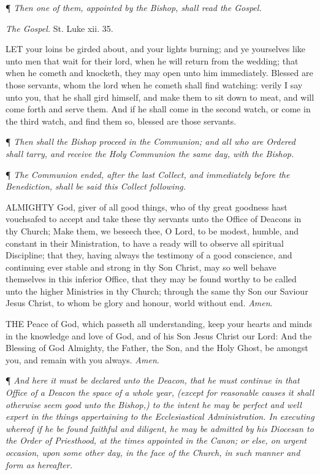¶ \emph{Then one of them, appointed
by the Bishop, shall read the Gospel.}

\emph{The Gospel.} St. Luke xii. 35.

LET your loins be girded
about, and your lights burning; and ye yourselves like unto men that wait
for their lord, when he will return from the wedding; that when he cometh
and knocketh, they may open unto him immediately. Blessed are those servants,
whom the lord when he cometh shall find watching: verily I say unto you,
that he shall gird himself, and make them to sit down to meat, and will
come forth and serve them. And if he shall come in the second watch, or
come in the third watch, and find them so, blessed are those servants.

¶ \emph{Then shall the
Bishop proceed in the Communion; and all who are Ordered shall tarry,
and receive the Holy Communion the same day, with the Bishop.}

¶ \emph{The Communion
ended, after the last Collect, and immediately before the Benediction,
shall be said this Collect following.}

ALMIGHTY God, giver of
all good things, who of thy great goodness hast vouchsafed to accept and
take these thy servants unto the Office of Deacons in thy Church; Make
them, we beseech thee, O Lord, to be modest, humble, and constant in their
Ministration, to have a ready will to observe all spiritual Discipline;
that they, having always the testimony of a good conscience, and continuing
ever stable and strong in thy Son Christ, may so well behave themselves
in this inferior Office, that they may be found worthy to be called unto
the higher Ministries in thy Church; through the same thy Son our Saviour
Jesus Christ, to whom be glory and honour, world without end. \emph{Amen}.

THE Peace of God, which
passeth all understanding, keep your hearts and minds in the knowledge
and love of God, and of his Son Jesus Christ our Lord: And the Blessing
of God Almighty, the Father, the Son, and the Holy Ghost, be amongst you,
and remain with you always. \emph{Amen}.

¶ \emph{And here it
must be declared unto the Deacon, that he must continue in that Office
of a Deacon the space of a whole year, (except for reasonable causes it
shall otherwise seem good unto the Bishop,) to the intent he may be perfect
and well expert in the things appertaining to the Ecclesiastical Administration.
In executing whereof if he be found faithful and diligent, he may be admitted
by his Diocesan to the Order of Priesthood, at the times appointed in
the Canon; or else, on urgent occasion, upon some other day, in the face
of the Church, in such manner and form as hereafter.}

